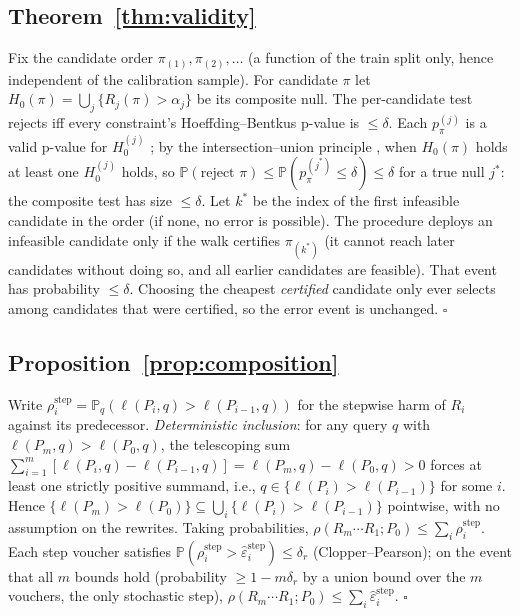 \documentclass[sigconf,nonacm]{acmart}
\newcommand{\eps}{\varepsilon}
\newcommand{\Prob}{\mathbb{P}}
\begin{document}
\subsection{Theorem~\ref{thm:validity}}
Fix the candidate order $\pi_{(1)}, \pi_{(2)}, \dots$ (a function of the
train split only, hence independent of the calibration sample). For
candidate $\pi$ let $H_0(\pi) = \bigcup_j \{R_j(\pi) > \alpha_j\}$ be its
composite null. The per-candidate test rejects iff every constraint's
Hoeffding--Bentkus p-value is $\le \delta$. Each $p^{(j)}_\pi$ is a valid
p-value for $H_0^{(j)}$ \cite{bentkus2004hoeffding,angelopoulos2021ltt};
by the intersection--union principle \cite{berger1982iut}, when
$H_0(\pi)$ holds at least one $H_0^{(j)}$ holds, so
$\Prob(\text{reject } \pi) \le \Prob(p^{(j^\ast)}_\pi \le \delta) \le
\delta$ for a true null $j^\ast$: the composite test has size $\le\delta$.
Let $k^\ast$ be the index of the first infeasible candidate in the order
(if none, no error is possible). The procedure deploys an infeasible
candidate only if the walk certifies $\pi_{(k^\ast)}$ (it cannot reach
later candidates without doing so, and all earlier candidates are
feasible). That event has probability $\le \delta$. Choosing the cheapest
\emph{certified} candidate only ever selects among candidates that were
certified, so the error event is unchanged. \hfill$\square$

\subsection{Proposition~\ref{prop:composition}}
Write $\rho_i^{\mathrm{step}} = \Prob_q(\ell(P_i, q) > \ell(P_{i-1}, q))$
for the stepwise harm of $R_i$ against its predecessor. \emph{Deterministic
inclusion}: for any query $q$ with $\ell(P_m, q) > \ell(P_0, q)$, the
telescoping sum $\sum_{i=1}^m [\ell(P_i, q) - \ell(P_{i-1}, q)] =
\ell(P_m, q) - \ell(P_0, q) > 0$ forces at least one strictly positive
summand, i.e., $q \in \{\ell(P_i) > \ell(P_{i-1})\}$ for some $i$. Hence
$\{\ell(P_m) > \ell(P_0)\} \subseteq \bigcup_i \{\ell(P_i) >
\ell(P_{i-1})\}$ pointwise, with no assumption on the rewrites. Taking
probabilities, $\rho(R_m \cdots R_1; P_0) \le \sum_i \rho_i^{\mathrm{step}}$.
Each step voucher satisfies $\Prob(\rho_i^{\mathrm{step}} >
\hat\eps_i^{\mathrm{step}}) \le \delta_r$ (Clopper--Pearson); on the event
that all $m$ bounds hold (probability $\ge 1 - m\delta_r$ by a union
bound over the $m$ vouchers, the only stochastic step),
$\rho(R_m \cdots R_1; P_0) \le \sum_i \hat\eps_i^{\mathrm{step}}$.
\hfill$\square$
\end{document}
